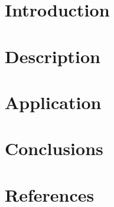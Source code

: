 \documentclass{bioinfo}
\begin{document}
\section{Introduction}
\section{Description}
\section{Application}
\section{Conclusions}
\section{References}



%
%
%
%
%
%
%




\end{document}
